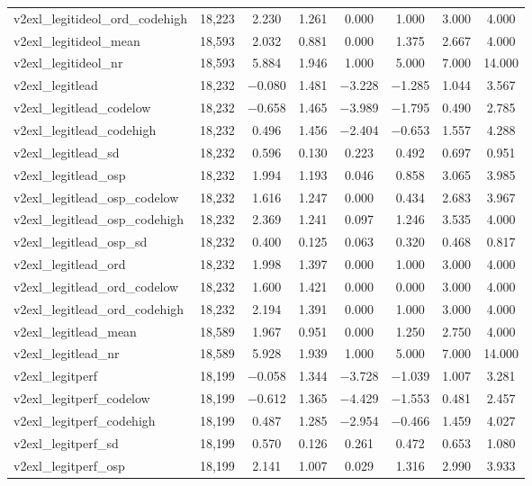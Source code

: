 \begin{table}[!htbp]
\begin{tabular}{@{\extracolsep{5pt}}lccccccc}
v2exl\_legitideol\_ord\_codehigh & 18,223 & 2.230 & 1.261 & 0.000 & 1.000 & 3.000 & 4.000 \\ 
v2exl\_legitideol\_mean & 18,593 & 2.032 & 0.881 & 0.000 & 1.375 & 2.667 & 4.000 \\ 
v2exl\_legitideol\_nr & 18,593 & 5.884 & 1.946 & 1.000 & 5.000 & 7.000 & 14.000 \\ 
v2exl\_legitlead & 18,232 & $-$0.080 & 1.481 & $-$3.228 & $-$1.285 & 1.044 & 3.567 \\ 
v2exl\_legitlead\_codelow & 18,232 & $-$0.658 & 1.465 & $-$3.989 & $-$1.795 & 0.490 & 2.785 \\ 
v2exl\_legitlead\_codehigh & 18,232 & 0.496 & 1.456 & $-$2.404 & $-$0.653 & 1.557 & 4.288 \\ 
v2exl\_legitlead\_sd & 18,232 & 0.596 & 0.130 & 0.223 & 0.492 & 0.697 & 0.951 \\ 
v2exl\_legitlead\_osp & 18,232 & 1.994 & 1.193 & 0.046 & 0.858 & 3.065 & 3.985 \\ 
v2exl\_legitlead\_osp\_codelow & 18,232 & 1.616 & 1.247 & 0.000 & 0.434 & 2.683 & 3.967 \\ 
v2exl\_legitlead\_osp\_codehigh & 18,232 & 2.369 & 1.241 & 0.097 & 1.246 & 3.535 & 4.000 \\ 
v2exl\_legitlead\_osp\_sd & 18,232 & 0.400 & 0.125 & 0.063 & 0.320 & 0.468 & 0.817 \\ 
v2exl\_legitlead\_ord & 18,232 & 1.998 & 1.397 & 0.000 & 1.000 & 3.000 & 4.000 \\ 
v2exl\_legitlead\_ord\_codelow & 18,232 & 1.600 & 1.421 & 0.000 & 0.000 & 3.000 & 4.000 \\ 
v2exl\_legitlead\_ord\_codehigh & 18,232 & 2.194 & 1.391 & 0.000 & 1.000 & 3.000 & 4.000 \\ 
v2exl\_legitlead\_mean & 18,589 & 1.967 & 0.951 & 0.000 & 1.250 & 2.750 & 4.000 \\ 
v2exl\_legitlead\_nr & 18,589 & 5.928 & 1.939 & 1.000 & 5.000 & 7.000 & 14.000 \\ 
v2exl\_legitperf & 18,199 & $-$0.058 & 1.344 & $-$3.728 & $-$1.039 & 1.007 & 3.281 \\ 
v2exl\_legitperf\_codelow & 18,199 & $-$0.612 & 1.365 & $-$4.429 & $-$1.553 & 0.481 & 2.457 \\ 
v2exl\_legitperf\_codehigh & 18,199 & 0.487 & 1.285 & $-$2.954 & $-$0.466 & 1.459 & 4.027 \\ 
v2exl\_legitperf\_sd & 18,199 & 0.570 & 0.126 & 0.261 & 0.472 & 0.653 & 1.080 \\ 
v2exl\_legitperf\_osp & 18,199 & 2.141 & 1.007 & 0.029 & 1.316 & 2.990 & 3.933 \\ 

\end{tabular}
\end{table}
